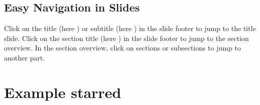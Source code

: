 \documentclass[
	aspectratio=169, %
	8pt, %
	english, %
]{beamer}
\begin{document}
\subsection{Easy Navigation in Slides}
\begin{frame}{\insertsubsection}
	\vfill
	Click on the title (here \textbf{\insertshorttitle}) or subtitle (here \textbf{\insertshortsubtitle}) in the slide footer to jump to the title slide.
	\vfill
	Click on the section title (here \textbf{\insertsection}) in the slide footer to jump to the section overview.
	\vfill
	In the section overview, click on sections or subsections to jump to another part.
	\vfill
\end{frame}
\section*{Example starred}
\lectureoverview
\end{document}
